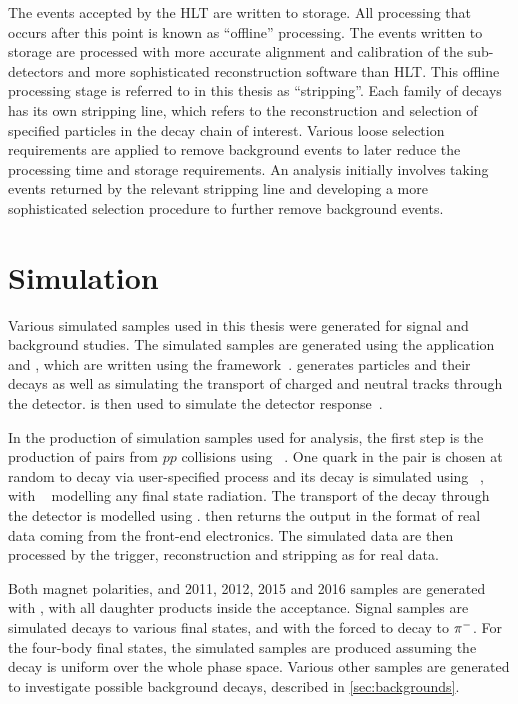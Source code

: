 The events accepted by the HLT are written to storage. All processing that occurs after this point is known as ``offline'' processing. The events written to storage are processed with more accurate alignment and calibration of the sub-detectors and more sophisticated reconstruction software than HLT. This offline processing stage is referred to in this thesis as ``stripping''. Each family of decays has its own stripping line, which refers to the reconstruction and selection of specified particles in the decay chain of interest. Various loose selection requirements are applied to remove background events to later reduce the processing time and storage requirements. An analysis initially involves taking events returned by the relevant stripping line and developing a more sophisticated selection procedure to further remove background events.

\section{Simulation}

Various simulated samples used in this thesis were generated for signal and background studies. The simulated samples are generated using the \lhcb application \gauss and \boole, which are written using the \gaudi framework~\cite{LHCb-PROC-2011-006,simulation}. \gauss generates particles and their decays as well as simulating the transport of charged and neutral tracks through the detector. \boole is then used to simulate the detector response~\cite{simulation}. 

In the production of simulation samples used for analysis, the first step is the production of \bquark\bquarkbar pairs from $pp$ collisions using ~\cite{Sjostrand:2007gs}. One quark in the \bquark\bquarkbar pair is chosen at random to decay via user-specified process and its decay is simulated using \evtgen~\cite{Lange:2001uf}, with \photos~\cite{Golonka:2005pn} modelling any final state radiation. The transport of the decay through the detector is modelled using \geant. \boole then returns the output in the format of real data coming from the front-end electronics. The simulated data are then processed by the trigger, reconstruction and stripping as for real data.

Both magnet polarities, and 2011, 2012, 2015 and 2016 samples are generated with , with all daughter products inside the \lhcb acceptance. Signal samples are simulated \btodkst decays to various \D final states, and with the \Kstarm forced to decay to \KS${{\pi}^-}$. For the four-body \D final states, the simulated samples are produced assuming the \D decay is uniform over the whole phase space. Various other samples are generated to investigate possible background decays, described in \sect\ref{sec:backgrounds}.
